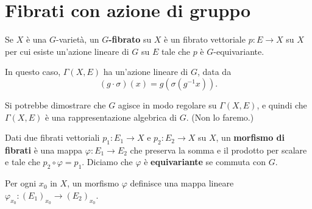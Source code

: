 \chapter{Fibrati con azione di gruppo}

\begin{definition}
    Se $X$ è una $G$-varietà, un \textbf{$G$-fibrato} su $X$ è un fibrato vettoriale $p\colon E \to X$ su $X$ per cui esiste un'azione lineare di $G$ su $E$ tale che $p$ è $G$-equivariante.
\end{definition}
\begin{remark}
In questo caso, $\Gamma(X,E)$ ha un'azione lineare di $G$, data da 
\[(g\cdot \sigma)(x)=g(\sigma(g^{-1}x)).\] 
\end{remark}

Si potrebbe dimostrare che $G$ agisce in modo regolare su $\Gamma(X,E)$, e quindi che $\Gamma(X,E)$ è una rappresentazione algebrica di $G$. (Non lo faremo.) 

\begin{definition}
    Dati due fibrati vettoriali $p_1\colon E_1 \to X$ e $p_2\colon E_2 \to X$ su $X$, un \textbf{morfismo di fibrati} è una mappa $\varphi\colon E_1 \to E_2$ che preserva la somma e il prodotto per scalare e tale che $p_2\circ\varphi=p_1$. Diciamo che $\varphi$ è \textbf{equivariante} se commuta con $G$.
\end{definition}

\begin{remark}
Per ogni $x_0$ in $X$, un morfismo $\varphi$ definisce una mappa lineare $\varphi_{x_0}\colon (E_1)_{x_0}\to (E_2)_{x_0}$. 
\end{remark}

